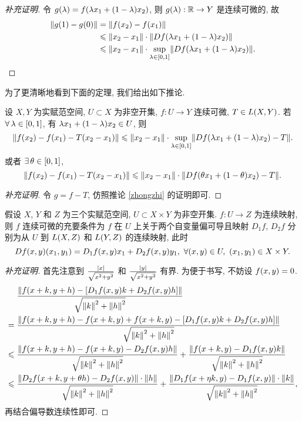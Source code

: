 \begin{proof}[补充证明]
令 $g\xk{\lambda}=f\xk{\lambda x_{1}+\xk{1-\lambda}x_{2}}$, 则 $g\xk{\lambda}:\rr\to Y$ 是连续可微的, 故
\begin{align*}
\fs{g\xk{1}-g\xk{0}}&= \fs{f\xk{x_{2}}-f\xk{x_{1}}}\\
&\leq \fs{x_{2}-x_{1}}\cdot \fs{Df\xk{\lambda x_{1}+\xk{1-\lambda}x_{2}}}\\
&\leq \fs{x_{2}-x_{1}}\cdot\sup _{\lambda\in\zk{0,1}}\fs{Df\xk{\lambda x_{1}+\xk{1-\lambda}x_{2}}}.\qedhere
\end{align*}
\end{proof}
为了更清晰地看到下面的定理, 我们给出如下推论.
\begin{corollary}[推论]
设 $X,Y$ 为实赋范空间, $U\subset X$ 为非空开集, $f:U\to Y$ 连续可微, $T\in L\xk{X,Y}$. 若 $\forall\lambda\in\zk{0,1}$, 有 $\lambda x_{1}+\xk{1-\lambda}x_{2}\in U$, 则
\[\fs{f\xk{x_{2}}-f\xk{x_{1}}-T\xk{x_{2}-x_{1}}}\leq\fs{x_{2}-x_{1}}\cdot\sup _{\lambda\in\zk{0,1}}\fs{Df\xk{\lambda x_{1}+\xk{1-\lambda}x_{2}}-T}.\]
或者 $\exists\theta\in\zk{0,1}$,
\[\fs{f\xk{x_{2}}-f\xk{x_{1}}-T\xk{x_{2}-x_{1}}}\leq\fs{x_{2}-x_{1}}\cdot\fs{Df\xk{\theta x_{1}+\xk{1-\theta}x_{2}}-T}.\]
\end{corollary}
\begin{proof}[补充证明]
令 $g=f-T$, 仿照推论 \ref{zhongzhi} 的证明即可.
\end{proof}
\begin{proposition}
假设 $X$, $Y$ 和 $Z$ 为三个实赋范空间, $U\subset X\times Y$ 为非空开集. $f:U\to Z$ 为连续映射, 则 $f$ 连续可微的充要条件为 $f$ 在 $U$ 上关于两个自变量偏可导且映射 $D_{1}f$, $D_{2}f$ 分别为从 $U$ 到 $L\xk{X,Z}$ 和 $L\xk{Y,Z}$ 的连续映射, 此时
\[Df\xk{x,y}\xk{x_{1},y_{1}}=D_{1}f\xk{x,y}x_{1}+D_{2}f\xk{x,y}y_{1},\ \forall\xk{x,y}\in U,\ \xk{x_{1},y_{1}}\in X\times Y.\]
\end{proposition}
\begin{proof}[补充证明]
首先注意到 $\frac{\left\vert x\right\vert}{\sqrt{x^{2}+y^{2}}}$ 和 $\frac{\left\vert y\right\vert}{\sqrt{x^{2}+y^{2}}}$ 有界. 为便于书写, 不妨设 $f\xk{x,y}=0$.
\begingroup
\allowdisplaybreaks
\begin{align*}
&\; \frac{\fs{f\xk{x+k,y+h}-\zk{D_{1}f\xk{x,y}k+D_{2}f\xk{x,y}h}}}{\sqrt{\fs{k}^{2}+\fs{h}^{2}}}\\
=&\; \frac{\fs{f\xk{x+k,y+h}-f\xk{x+k,y}+f\xk{x+k,y}-\zk{D_{1}f\xk{x,y}k+D_{2}f\xk{x,y}h}}}{\sqrt{\fs{k}^{2}+\fs{h}^{2}}}\\
\leq&\; \frac{\fs{f\xk{x+k,y+h}-f\xk{x+k,y}-D_{2}f\xk{x,y}h}}{\sqrt{\fs{k}^{2}+\fs{h}^{2}}}+\frac{\fs{f\xk{x+k,y}-D_{1}f\xk{x,y}k}}{\sqrt{\fs{k}^{2}+\fs{h}^{2}}}\\
\leq&\; \frac{\fs{D_{2}f\xk{x+k,y+\theta h}-D_{2}f\xk{x,y}}\cdot\fs{h}}{\sqrt{\fs{k}^{2}+\fs{h}^{2}}}+\frac{\fs{D_{1}f\xk{x+\eta k,y}-D_{1}f\xk{x,y}}\cdot\fs{k}}{\sqrt{\fs{k}^{2}+\fs{h}^{2}}},
\end{align*}
\endgroup
再结合偏导数连续性即可.
\end{proof}
